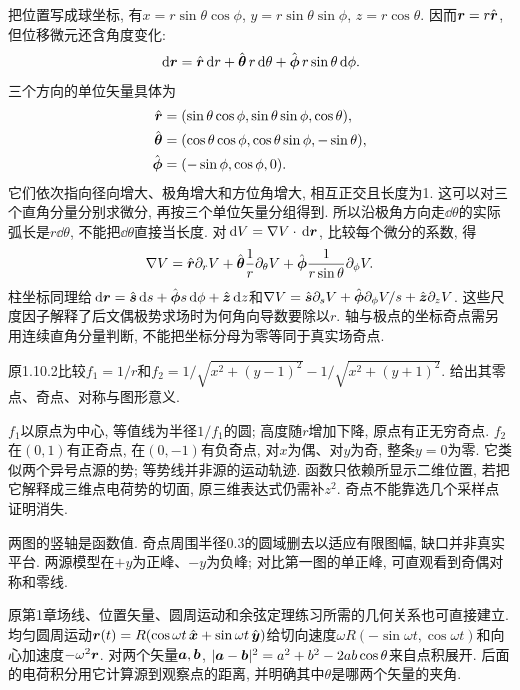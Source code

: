 \label{tb:coordinates}
把位置写成球坐标, 有$x=r\sin\theta\cos\phi$, $y=r\sin\theta\sin\phi$, $z=r\cos\theta$. 因而$\boldsymbol{r}=r\hat{\boldsymbol{r}}$, 但位移微元还含角度变化:
\[
\,\mathrm d\boldsymbol{r}=\hat{\boldsymbol{r}}\,\mathrm d r+\hat{\boldsymbol{\theta}}\,r\,\mathrm d\theta
 +\hat{\boldsymbol{\phi}}\,r\sin\theta\,\mathrm d\phi.
\]
三个方向的单位矢量具体为
\begin{align*}
\hat{\boldsymbol{r}}&=(\sin\theta\cos\phi,\sin\theta\sin\phi,\cos\theta),\\
\hat{\boldsymbol{\theta}}&=(\cos\theta\cos\phi,\cos\theta\sin\phi,-\sin\theta),\\
\hat{\boldsymbol{\phi}}&=(-\sin\phi,\cos\phi,0).
\end{align*}
它们依次指向径向增大、极角增大和方位角增大, 相互正交且长度为1.
这可以对三个直角分量分别求微分, 再按三个单位矢量分组得到. 所以沿极角方向走$\dd\theta$的实际弧长是$r\dd\theta$, 不能把$\dd\theta$直接当长度. 对$\,\mathrm d V=\nabla V\cdot\,\mathrm d\boldsymbol{r}$, 比较每个微分的系数, 得
\[
\nabla V=\hat{\boldsymbol{r}}\partial_rV+\hat{\boldsymbol{\theta}}\frac1r\partial_\theta V
 +\hat{\boldsymbol{\phi}}\frac1{r\sin\theta}\partial_\phi V.
\]
柱坐标同理给$\,\mathrm d\boldsymbol{r}=\hat{\boldsymbol{s}}\,\mathrm d s+\hat{\boldsymbol{\phi}} s\,\mathrm d\phi+\hat{\boldsymbol{z}}\,\mathrm d z$和$\nabla V=\hat{\boldsymbol{s}}\partial_sV+\hat{\boldsymbol{\phi}}\partial_\phi V/s+\hat{\boldsymbol{z}}\partial_zV$. 这些尺度因子解释了后文偶极势求场时为何角向导数要除以$r$. 轴与极点的坐标奇点需另用连续直角分量判断, 不能把坐标分母为零等同于真实场奇点.

\begin{example}\label{ex:scalarplots}
原1.10.2比较$f_1=1/r$和$f_2=1/\sqrt{x^2+(y-1)^2}-1/\sqrt{x^2+(y+1)^2}$. 给出其零点、奇点、对称与图形意义.
\end{example}
\begin{solution}
$f_1$以原点为中心, 等值线为半径$1/f_1$的圆; 高度随$r$增加下降, 原点有正无穷奇点. $f_2$在$(0,1)$有正奇点, 在$(0,-1)$有负奇点, 对$x$为偶、对$y$为奇, 整条$y=0$为零. 它类似两个异号点源的势; 等势线并非源的运动轨迹. 函数只依赖所显示二维位置, 若把它解释成三维点电荷势的切面, 原三维表达式仍需补$z^2$. 奇点不能靠选几个采样点证明消失.
\end{solution}
\begin{center}
\hfill
{}
\end{center}
两图的竖轴是函数值. 奇点周围半径0.3的圆域删去以适应有限图幅, 缺口并非真实平台. 两源模型在$+y$为正峰、$-y$为负峰; 对比第一图的单正峰, 可直观看到奇偶对称和零线.

原第1章场线、位置矢量、圆周运动和余弦定理练习所需的几何关系也可直接建立. 均匀圆周运动$\boldsymbol{r}(t)=R(\cos\omega t\,\hat{\boldsymbol{x}}+\sin\omega t\,\hat{\boldsymbol{y}})$给切向速度$\omega R(-\sin\omega t,\cos\omega t)$和向心加速度$-\omega^2\boldsymbol{r}$. 对两个矢量$\boldsymbol{a},\boldsymbol{b}$, $|\boldsymbol{a}-\boldsymbol{b}|^2=a^2+b^2-2ab\cos\theta$来自点积展开. 后面的电荷积分用它计算源到观察点的距离, 并明确其中$\theta$是哪两个矢量的夹角.
